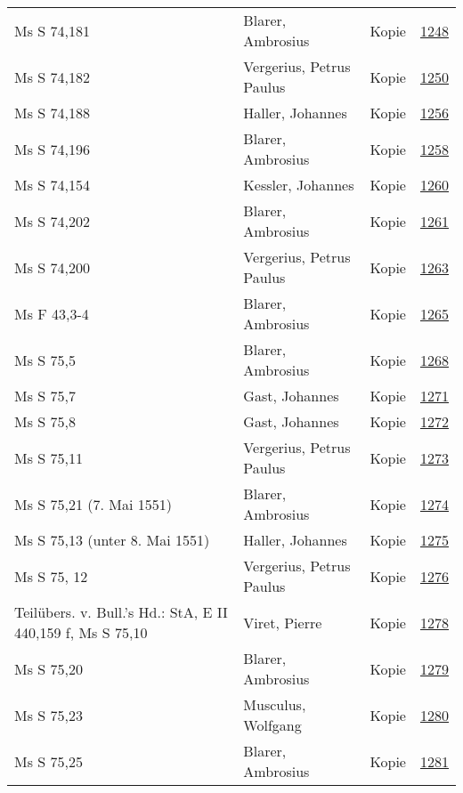 \documentclass[10pt,a4paper,landscape]{report}
\begin{document}
\begin{longtable}{p{16cm}p{4cm}lr}
Ms S 74,181	&	Blarer, Ambrosius	&	Kopie	&	\href{http://130.60.24.72/assignment/1248}{1248}\\
Ms S 74,182	&	Vergerius, Petrus Paulus	&	Kopie	&	\href{http://130.60.24.72/assignment/1250}{1250}\\
Ms S 74,188	&	Haller, Johannes	&	Kopie	&	\href{http://130.60.24.72/assignment/1256}{1256}\\
Ms S 74,196	&	Blarer, Ambrosius	&	Kopie	&	\href{http://130.60.24.72/assignment/1258}{1258}\\
Ms S 74,154	&	Kessler, Johannes	&	Kopie	&	\href{http://130.60.24.72/assignment/1260}{1260}\\
Ms S 74,202	&	Blarer, Ambrosius	&	Kopie	&	\href{http://130.60.24.72/assignment/1261}{1261}\\
Ms S 74,200	&	Vergerius, Petrus Paulus	&	Kopie	&	\href{http://130.60.24.72/assignment/1263}{1263}\\
Ms F 43,3-4	&	Blarer, Ambrosius	&	Kopie	&	\href{http://130.60.24.72/assignment/1265}{1265}\\
Ms S 75,5	&	Blarer, Ambrosius	&	Kopie	&	\href{http://130.60.24.72/assignment/1268}{1268}\\
Ms S 75,7	&	Gast, Johannes	&	Kopie	&	\href{http://130.60.24.72/assignment/1271}{1271}\\
Ms S 75,8	&	Gast, Johannes	&	Kopie	&	\href{http://130.60.24.72/assignment/1272}{1272}\\
Ms S 75,11	&	Vergerius, Petrus Paulus	&	Kopie	&	\href{http://130.60.24.72/assignment/1273}{1273}\\
Ms S 75,21 (7. Mai 1551)	&	Blarer, Ambrosius	&	Kopie	&	\href{http://130.60.24.72/assignment/1274}{1274}\\
Ms S 75,13 (unter 8. Mai 1551)	&	Haller, Johannes	&	Kopie	&	\href{http://130.60.24.72/assignment/1275}{1275}\\
Ms S 75, 12	&	Vergerius, Petrus Paulus	&	Kopie	&	\href{http://130.60.24.72/assignment/1276}{1276}\\
Teilübers. v. Bull.'s Hd.: StA, E II 440,159 f, Ms S 75,10	&	Viret, Pierre	&	Kopie	&	\href{http://130.60.24.72/assignment/1278}{1278}\\
Ms S 75,20	&	Blarer, Ambrosius	&	Kopie	&	\href{http://130.60.24.72/assignment/1279}{1279}\\
Ms S 75,23	&	Musculus, Wolfgang	&	Kopie	&	\href{http://130.60.24.72/assignment/1280}{1280}\\
Ms S 75,25	&	Blarer, Ambrosius	&	Kopie	&	\href{http://130.60.24.72/assignment/1281}{1281}\\

\end{longtable}
\end{document}
